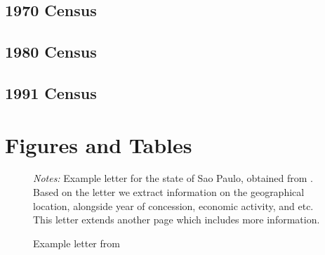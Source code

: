 \documentclass[11pt]{article}
\begin{document}
%

\begin{comment}
\section{Other Censuses}
\subsection{1920 Census}

\clearpage
\end{comment}

\subsection{1970 Census}







\subsection{1980 Census}

\subsection{1991 Census}

\appendix

\setcounter{figure}{0}  
\setcounter{table}{0}  

\renewcommand{\thefigure}{A.\arabic{figure}}
\renewcommand{\thetable}{A.\arabic{table}}

\section{Figures and Tables}

\begin{figure}[h!]
  \begin{center}
  \caption{Example letter from \textcite{noauthor_1921-qd}}
  \label{fig:example_letter_sp}
  \vspace{3mm}
  \end{center}
  \textit{Notes:} Example letter for the state of Sao Paulo, obtained from \textcite[p.~47]{noauthor_1921-qd}. Based on the letter we extract information on the geographical location, alongside year of concession, economic activity, and etc. This letter extends another page which includes more information.
\end{figure}
\end{document}
